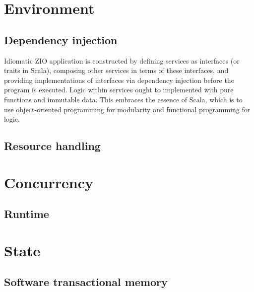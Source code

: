



\section{Environment}




\subsection{Dependency injection}
Idiomatic ZIO application is constructed by defining services as interfaces (or traits in Scala), composing other services in terms of these interfaces, and providing implementations of interfaces via dependency injection before the program is executed. Logic within services ought to implemented with pure functions and immutable data. This embraces the essence of Scala, which is to use object-oriented programming for modularity and functional programming for logic.
% 


\subsection{Resource handling} \label{zio:resource-handling}

\section{Concurrency}


\subsection{Runtime}


\section{State}
\subsection{Software transactional memory}
